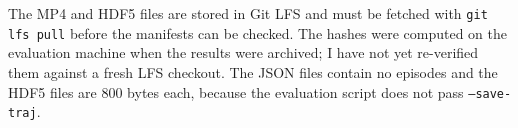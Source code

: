 The MP4 and HDF5 files are stored in Git LFS and must be fetched with \texttt{git lfs pull} before the manifests can be checked. The hashes were computed on the evaluation machine when the results were archived; I have not yet re-verified them against a fresh LFS checkout. The JSON files contain no episodes and the HDF5 files are 800 bytes each, because the evaluation script does not pass \texttt{--save-traj}.

\endgroup

